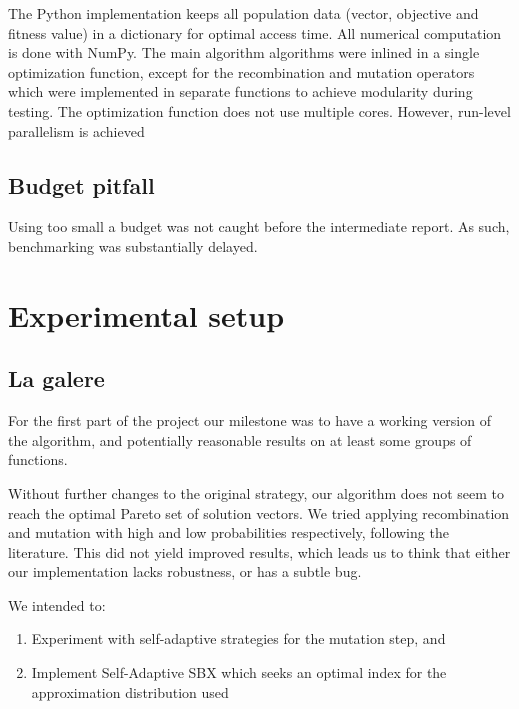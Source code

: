 \documentclass{sig-alternate}
\begin{document}
The Python implementation keeps all population data (vector, objective and fitness value) in a dictionary for optimal access time. All numerical computation is done with NumPy. The main algorithm algorithms were inlined in a single optimization function, except for the recombination and mutation operators which were implemented in separate functions to achieve modularity during testing. The optimization function does not use multiple cores. However, run-level parallelism is achieved 

\subsection*{Budget pitfall} Using too small a budget was not caught before the intermediate report. As such, benchmarking was substantially delayed.
\section{Experimental setup}
\subsection{La galere}
 For the first part of the project our milestone was to have a working version of the algorithm, and potentially reasonable results on at least some groups of functions.
 
Without further changes to the original strategy, our algorithm does not seem to reach the optimal Pareto set of solution vectors. We tried applying recombination and mutation with high and low probabilities respectively, following the literature. This did not yield improved results, which leads us to think that either our implementation lacks robustness, or has a subtle bug.

We intended to:
\begin{enumerate}
\item Experiment with self-adaptive strategies for the mutation step, and 
\item Implement Self-Adaptive SBX which seeks an optimal index for the approximation distribution used
\end{enumerate}
\end{document}
